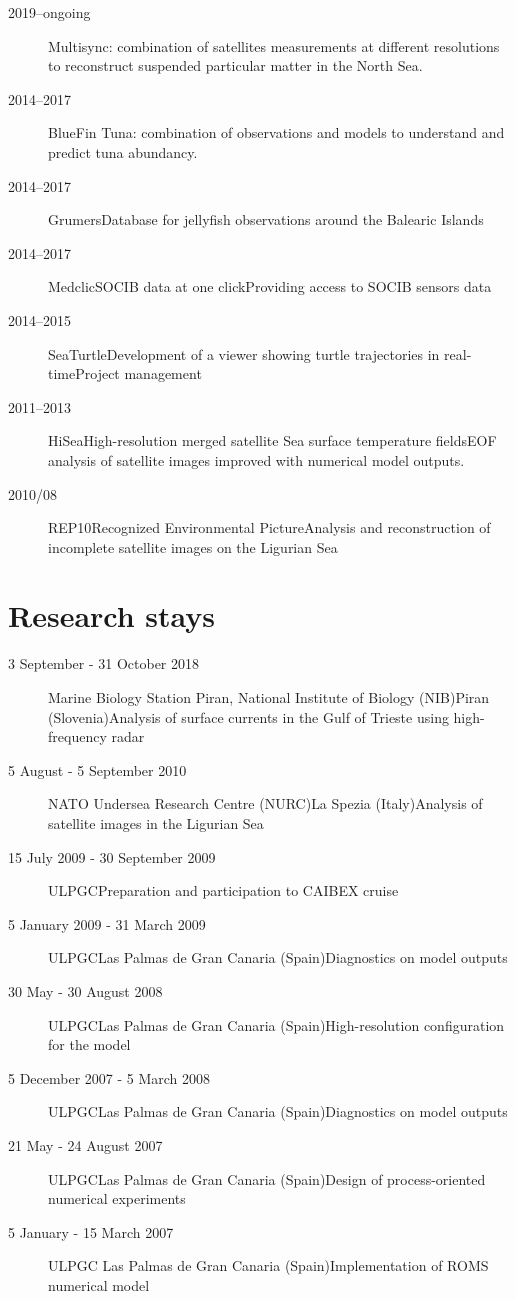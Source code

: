 \documentclass[11pt,a4paper,svgnames]{article}
\begin{document}
\begin{description}
\item[2019--ongoing] Multisync: combination of satellites measurements at different resolutions to reconstruct suspended particular matter in the North Sea.
\item[2014--2017] {BlueFin Tuna}: combination of observations and models to understand and predict tuna abundancy.
\item[2014--2017] {Grumers}{Database for jellyfish observations around the Balearic Islands} 
\item[2014--2017] {Medclic}{SOCIB data at one click}{Providing access to SOCIB sensors data} 
\item[2014--2015] {SeaTurtle}{Development of a viewer showing turtle trajectories in real-time}{Project management}{}{}
\item[2011--2013] {HiSea}{High-resolution merged satellite Sea surface temperature fields}{EOF analysis of satellite images improved with numerical model outputs.}
\item[2010/08] {REP10}{Recognized Environmental Picture}{Analysis and reconstruction of incomplete satellite images on the Ligurian Sea}
\end{description}

\section{Research stays}

\begin{description}
\item[3 September - 31 October 2018] {Marine Biology Station Piran, National Institute of Biology (NIB)}{Piran (Slovenia)}{Analysis of surface currents in the Gulf of Trieste using high-frequency radar}{}{}
\item[5 August - 5 September 2010] {NATO Undersea Research Centre (NURC)}{La Spezia (Italy)}{Analysis of satellite images in the Ligurian Sea} 
\item[15 July 2009 - 30 September 2009] {ULPGC}{Preparation and participation to CAIBEX cruise} 
\item[5 January 2009 - 31 March 2009] {ULPGC}{Las Palmas de Gran Canaria (Spain)}{Diagnostics on model outputs}
\item[30 May - 30 August 2008]{ULPGC}{Las Palmas de Gran Canaria (Spain)}{High-resolution configuration for the model}
\item[5 December 2007 - 5 March 2008] {ULPGC}{Las Palmas de Gran Canaria (Spain)}{Diagnostics on model outputs}
\item[21 May - 24 August 2007]{ULPGC}{Las Palmas de Gran Canaria (Spain)}{Design of process-oriented numerical experiments}
\item[5 January - 15 March 2007]{ULPGC} {Las Palmas de Gran Canaria (Spain)}{Implementation of ROMS numerical model}
\end{description}
\end{document}
